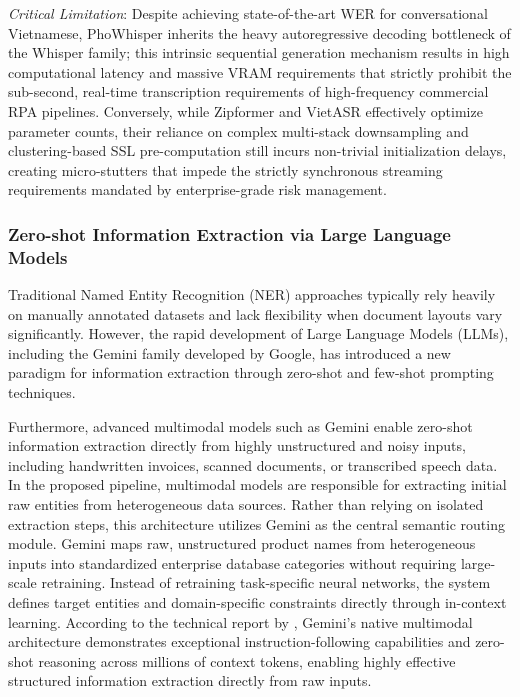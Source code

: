 \textit{Critical Limitation}: Despite achieving state-of-the-art WER for conversational Vietnamese, PhoWhisper inherits the heavy autoregressive decoding bottleneck of the Whisper family; this intrinsic sequential generation mechanism results in high computational latency and massive VRAM requirements that strictly prohibit the sub-second, real-time transcription requirements of high-frequency commercial RPA pipelines. Conversely, while Zipformer and VietASR effectively optimize parameter counts, their reliance on complex multi-stack downsampling and clustering-based SSL pre-computation still incurs non-trivial initialization delays, creating micro-stutters that impede the strictly synchronous streaming requirements mandated by enterprise-grade risk management.

\subsubsection{Zero-shot Information Extraction via Large Language Models}
Traditional Named Entity Recognition (NER) approaches typically rely heavily on manually annotated datasets and lack flexibility when document layouts vary significantly. However, the rapid development of Large Language Models (LLMs), including the Gemini family developed by Google, has introduced a new paradigm for information extraction through zero-shot and few-shot prompting techniques.

Furthermore, advanced multimodal models such as Gemini enable zero-shot information extraction directly from highly unstructured and noisy inputs, including handwritten invoices, scanned documents, or transcribed speech data. In the proposed pipeline, multimodal models are responsible for extracting initial raw entities from heterogeneous data sources. Rather than relying on isolated extraction steps, this architecture utilizes Gemini as the central semantic routing module. Gemini maps raw, unstructured product names from heterogeneous inputs into standardized enterprise database categories without requiring large-scale retraining. Instead of retraining task-specific neural networks, the system defines target entities and domain-specific constraints directly through in-context learning. According to the technical report by \textcite{reid2024gemini}, Gemini's native multimodal architecture demonstrates exceptional instruction-following capabilities and zero-shot reasoning across millions of context tokens, enabling highly effective structured information extraction directly from raw inputs.

